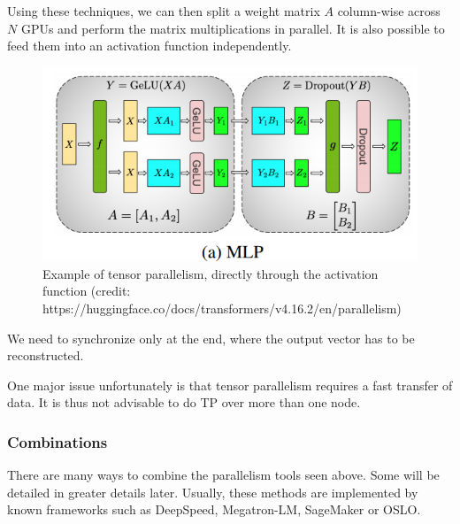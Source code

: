 \documentclass{article}
\begin{document}
Using these techniques, we can then split a weight matrix \(A\) column-wise across \(N\) GPUs and perform the matrix multiplications in parallel. It is also possible to feed them into an activation function independently.

\begin{figure}[h!]
  \center
  \includegraphics[width=0.5\linewidth]{images/2022-08-25-10-04-26.png}
  \caption{Example of tensor parallelism, directly through the activation function (credit: https://huggingface.co/docs/transformers/v4.16.2/en/parallelism)}
\end{figure}
\FloatBarrier

We need to synchronize only at the end, where the output vector has to be reconstructed.

One major issue unfortunately is that tensor parallelism requires a fast transfer of data. It is thus not advisable to do TP over more than one node.

\subsubsection{Combinations}
There are many ways to combine the parallelism tools seen above. Some will be detailed in greater details later. Usually, these methods are implemented by known frameworks such as DeepSpeed, Megatron-LM, SageMaker or OSLO.
\end{document}
